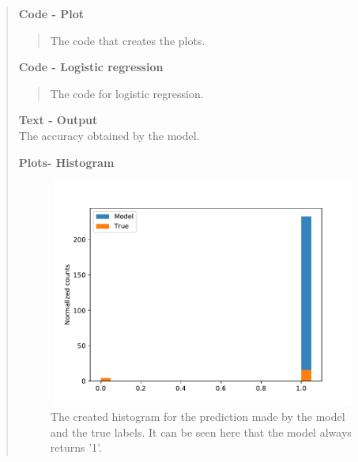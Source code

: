 \begin{quote}
\begin{quote}
\end{quote}

\textbf{Code - Plot}
\begin{quote}
The code that creates the plots.

\end{quote}

\textbf{Code - Logistic regression}
\begin{quote}
The code for logistic regression.

\end{quote}
\newpage

\textbf{Text - Output} \\

The accuracy obtained by the model.
\begin{quote}

\end{quote}

\textbf{Plots- Histogram}
\begin{figure}[!hb]
\centering
\includegraphics[width=14cm, height=7.5cm]{./Plots/6a_hist.pdf}
\caption{The created histogram for the prediction made by the model and the true labels. It can be seen here that the model always returns '1'. }
\end{figure}

\begin{quote} 


\end{quote}
\end{quote}







